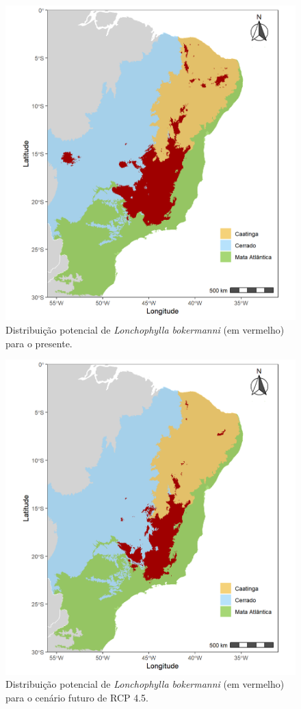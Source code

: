 \documentclass[
  11pt,
]{article}
\begin{document}
\begin{figure}
\centering
\includegraphics[width=1\textwidth,height=\textheight]{../Graficos/L_bokermanni_mapas_feitos/presente_e_biomas.jpeg}
\caption{Distribuição potencial de \emph{Lonchophylla bokermanni} (em
vermelho) para o presente.}
\end{figure}

\begin{figure}
\centering
\includegraphics[width=1\textwidth,height=\textheight]{../Graficos/L_bokermanni_mapas_feitos/RCP45.jpeg}
\caption{Distribuição potencial de \emph{Lonchophylla bokermanni} (em
vermelho) para o cenário futuro de RCP 4.5.}
\end{figure}
\end{document}
